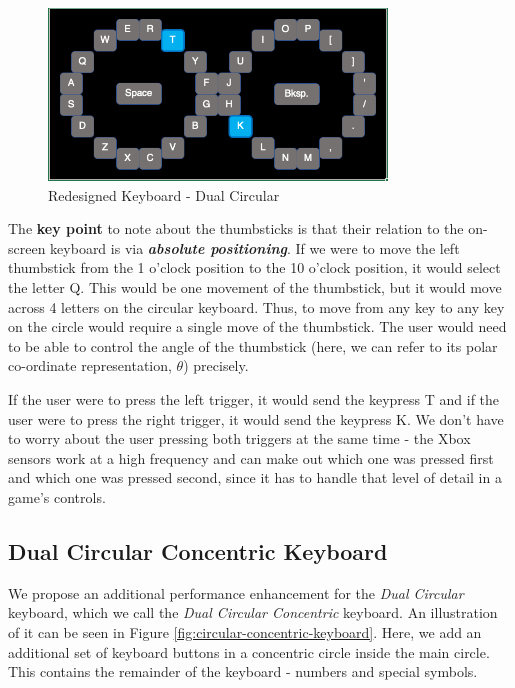 \documentclass[
	letterpaper, %
]{jdf}
\begin{document}
\begin{figure}[h]
	\centering
	\includegraphics[width=9cm]{jdf-master/Figures/dual-circular-keyboard.png}
	\caption{Redesigned Keyboard - Dual Circular}
	\label{fig:circular-keyboard}
\end{figure}

The \textbf{key point} to note about the thumbsticks is that their relation to the on-screen keyboard is via \textit{\textbf{absolute positioning}}. If we were to move the left thumbstick from the 1 o'clock position to the 10 o'clock position, it would select the letter Q. This would be one movement of the thumbstick, but it would move across 4 letters on the circular keyboard. Thus, to move from any key to any key on the circle would require a single move of the thumbstick. The user would need to be able to control the angle of the thumbstick (here, we can refer to its polar co-ordinate representation, $\theta$) precisely.

If the user were to press the left trigger, it would send the keypress T and if the user were to press the right trigger, it would send the keypress K. We don't have to worry about the user pressing both triggers at the same time - the Xbox sensors work at a high frequency and can make out which one was pressed first and which one was pressed second, since it has to handle that level of detail in a game's controls.



\subsection{Dual Circular Concentric Keyboard}
We propose an additional performance enhancement for the \textit{Dual Circular} keyboard, which we call the \textit{Dual Circular Concentric} keyboard. An illustration of it can be seen in Figure \ref{fig:circular-concentric-keyboard}. Here, we add an additional set of keyboard buttons in a concentric circle inside the main circle. This contains the remainder of the keyboard - numbers and special symbols. 
\end{document}
